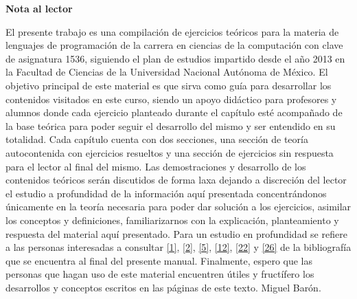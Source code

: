 \begin{center}
	\large
	{\bf Nota al lector}
\end{center}
	El presente trabajo es una compilación de ejercicios teóricos para la materia de lenguajes de programación de la carrera en ciencias de la computación con clave de asignatura 1536, siguiendo el plan de estudios impartido desde el año 2013 en la Facultad de Ciencias de la Universidad Nacional Autónoma de México.\newline\newline
	El objetivo principal de este material es que sirva como guía para desarrollar los contenidos visitados en este curso, siendo un apoyo didáctico para profesores y alumnos donde cada ejercicio planteado durante el capítulo esté acompañado de la base teórica para poder seguir el desarrollo del mismo y ser entendido en su totalidad.\newline\newline
	Cada capítulo cuenta con dos secciones, una sección de teoría autocontenida con ejercicios resueltos y una sección de ejercicios sin respuesta para el lector al final del mismo. \newline\newline
	Las demostraciones y desarrollo de los contenidos teóricos serán discutidos de forma laxa dejando a discreción del lector el estudio a profundidad de la información aquí presentada concentrándonos únicamente en la teoría necesaria para poder dar solución a los ejercicios, asimilar los conceptos y definiciones, familiarizarnos con la explicación, planteamiento y respuesta del material aquí presentado. \newline\newline
	Para un estudio en profundidad se refiere a las personas interesadas a consultar  \hyperlink{1}{[1]},   \hyperlink{2}{[2]},   \hyperlink{5}{[5]},   \hyperlink{12}{[12]},  \hyperlink{22}{[22]} y  \hyperlink{26}{[26]} de la bibliografía que se encuentra al final del presente manual.\newline\newline 
	Finalmente, espero que las personas que hagan uso de este material encuentren útiles y fructífero los desarrollos y conceptos escritos en las páginas de este texto. \newline\newline\newline\newline\newline
	Miguel Barón.

\vspace{50mm}

\newpage
\phantom{~}
\newpage
